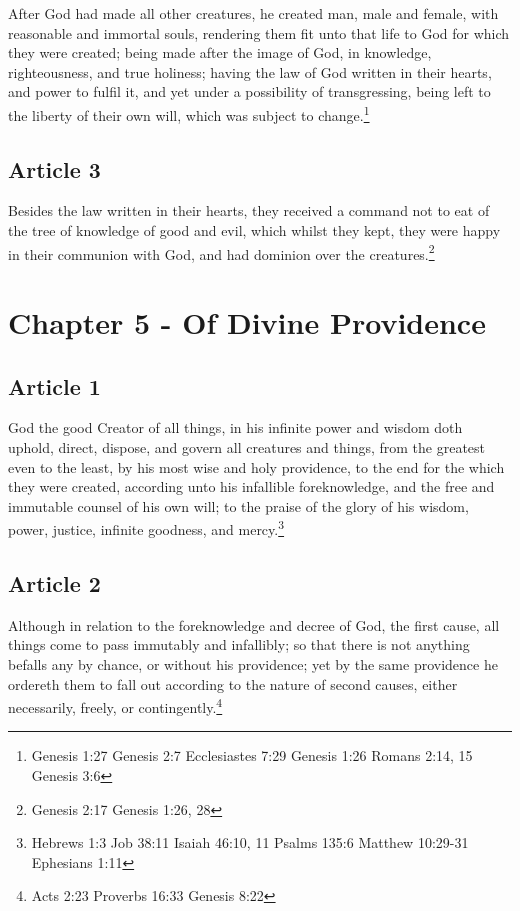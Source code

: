\documentclass[12pt,letterpaper]{book}
\begin{document}
After God had made all other creatures, he created man, male and female, with reasonable and immortal souls, rendering them fit unto that life to God for which they were created; being made after the image of God, in knowledge, righteousness, and true holiness; having the law of God written in their hearts, and power to fulfil it, and yet under a possibility of transgressing, being left to the liberty of their own will, which was subject to change.\footnote{Genesis 1:27 Genesis 2:7 Ecclesiastes 7:29 Genesis 1:26 Romans 2:14, 15 Genesis 3:6}

\section{Article 3}

Besides the law written in their hearts, they received a command not to eat of the tree of knowledge of good and evil, which whilst they kept, they were happy in their communion with God, and had dominion over the creatures.\footnote{Genesis 2:17 Genesis 1:26, 28}

\chapter{Chapter 5 - Of Divine Providence}
\section{Article 1}

God the good Creator of all things, in his infinite power and wisdom doth uphold, direct, dispose, and govern all creatures and things, from the greatest even to the least, by his most wise and holy providence, to the end for the which they were created, according unto his infallible foreknowledge, and the free and immutable counsel of his own will; to the praise of the glory of his wisdom, power, justice, infinite goodness, and mercy.\footnote{Hebrews 1:3 Job 38:11 Isaiah 46:10, 11 Psalms 135:6 Matthew 10:29-31 Ephesians 1:11}

\section{Article 2}

Although in relation to the foreknowledge and decree of God, the first cause, all things come to pass immutably and infallibly; so that there is not anything befalls any by chance, or without his providence; yet by the same providence he ordereth them to fall out according to the nature of second causes, either necessarily, freely, or contingently.\footnote{Acts 2:23 Proverbs 16:33 Genesis 8:22}
\end{document}
